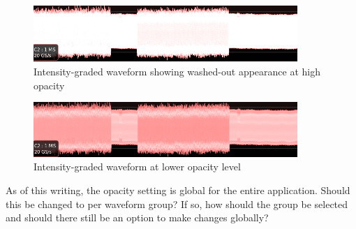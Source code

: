 \begin{figure}[H]
\centering
\includegraphics[width=10cm]{images/washedout-waveform.png}
\caption{Intensity-graded waveform showing washed-out appearance at high opacity}
\label{washedout-waveform}
\end{figure}

\begin{figure}[H]
\centering
\includegraphics[width=10cm]{images/graded-waveform.png}
\caption{Intensity-graded waveform at lower opacity level}
\label{graded-waveform}
\end{figure}

As of this writing, the opacity setting is global for the entire application. Should this be changed to per waveform
group? If so, how should the group be selected and should there still be an option to make changes globally?
